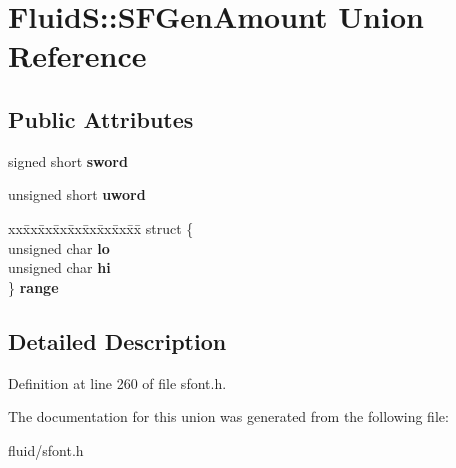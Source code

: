 \hypertarget{union_fluid_s_1_1_s_f_gen_amount}{}\section{FluidS\+:\+:S\+F\+Gen\+Amount Union Reference}
\label{union_fluid_s_1_1_s_f_gen_amount}
\subsection*{Public Attributes}
\begin{DoxyCompactItemize}
\item 
\mbox{\label{union_fluid_s_1_1_s_f_gen_amount_a35ec46b6d8baf6fde593ddf8bd339a33}} 
signed short {\bfseries sword}
\item 
\mbox{\label{union_fluid_s_1_1_s_f_gen_amount_ae7284c53189e9317951847601d951183}} 
unsigned short {\bfseries uword}
\item 
\mbox{\label{union_fluid_s_1_1_s_f_gen_amount_a0ae32f9a176737650ccc1b93927fe1bb}} 
\begin{tabbing}
xx\=xx\=xx\=xx\=xx\=xx\=xx\=xx\=xx\=\kill
struct \{\\
\>unsigned char {\bfseries lo}\\
\>unsigned char {\bfseries hi}\\
\} {\bfseries range}\\

\end{tabbing}\end{DoxyCompactItemize}


\subsection{Detailed Description}


Definition at line 260 of file sfont.\+h.



The documentation for this union was generated from the following file\+:\begin{DoxyCompactItemize}
\item 
fluid/sfont.\+h\end{DoxyCompactItemize}
